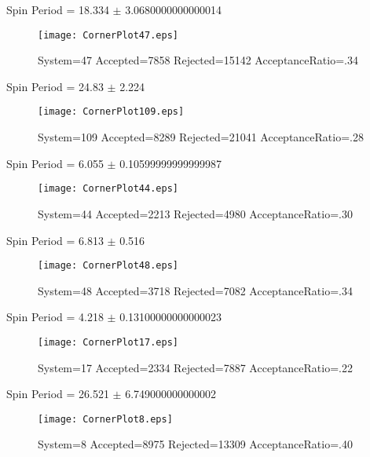 \documentclass[10pt]{article}
\begin{document}
\newpage
\begin{center}
        Spin Period = 18.334 $\pm$ 3.0680000000000014
        \end{center}
\begin{figure}[H] 
        \texttt{[image: CornerPlot47.eps]}
        \caption{System=47 Accepted=7858 Rejected=15142 AcceptanceRatio=.34}
        \label{S47}
        \centering
        \end{figure}
\newpage
\begin{center}
        Spin Period = 24.83 $\pm$ 2.224
        \end{center}
\begin{figure}[H] 
        \texttt{[image: CornerPlot109.eps]}
        \caption{System=109 Accepted=8289 Rejected=21041 AcceptanceRatio=.28}
        \label{S109}
        \centering
        \end{figure}
\newpage
\begin{center}
        Spin Period = 6.055 $\pm$ 0.10599999999999987
        \end{center}
\begin{figure}[H] 
        \texttt{[image: CornerPlot44.eps]}
        \caption{System=44 Accepted=2213 Rejected=4980 AcceptanceRatio=.30}
        \label{S44}
        \centering
        \end{figure}
\newpage
\begin{center}
        Spin Period = 6.813 $\pm$ 0.516
        \end{center}
\begin{figure}[H] 
        \texttt{[image: CornerPlot48.eps]}
        \caption{System=48 Accepted=3718 Rejected=7082 AcceptanceRatio=.34}
        \label{S48}
        \centering
        \end{figure}
\newpage
\begin{center}
        Spin Period = 4.218 $\pm$ 0.13100000000000023
        \end{center}
\begin{figure}[H] 
        \texttt{[image: CornerPlot17.eps]}
        \caption{System=17 Accepted=2334 Rejected=7887 AcceptanceRatio=.22}
        \label{S17}
        \centering
        \end{figure}
\newpage
\begin{center}
        Spin Period = 26.521 $\pm$ 6.749000000000002
        \end{center}
\begin{figure}[H] 
        \texttt{[image: CornerPlot8.eps]}
        \caption{System=8 Accepted=8975 Rejected=13309 AcceptanceRatio=.40}
        \label{S8}
        \centering
        \end{figure}
\end{document}
